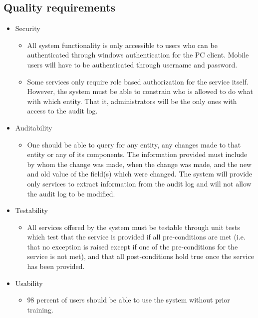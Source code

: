 \documentclass[11pt,a4paper]{article}
\begin{document}
\subsection{Quality requirements}
\begin{itemize}
\item Security
	\begin{itemize}
	\item All system functionality is only accessible to users who can be authenticated through windows authentication for the PC client. Mobile users will have to be authenticated through username and password.
\item Some services only require role based authorization for the service itself. However, the system must be able to constrain who is allowed to do what with which entity. That it, administrators will be the only ones with access to the audit log.
	\end{itemize}
\end{itemize}
\begin{itemize}
\item Auditability
	\begin{itemize}
	\item One should be able to query for any entity, any changes made to that entity or any of its components. The information provided must include by whom the change was made, when the change was made, and the new and old value of the field(s) which were changed. The system will provide only services to extract information from the audit log and will not allow the audit log to be modified.
	\end{itemize}
\end{itemize}
\begin{itemize}
\item Testability
	\begin{itemize}
	\item All services offered by the system must be testable through unit tests which test that the service is provided if all pre-conditions are met (i.e. that no exception is raised except if one of the pre-conditions for the service is not met), and that all post-conditions hold true once the service has been provided.
	\end{itemize}
\end{itemize}	
\begin{itemize}
\item Usability
	\begin{itemize}
	\item 98 percent of users should be able to use the system without prior training.
	\end{itemize}
\end{itemize}
\end{document}
